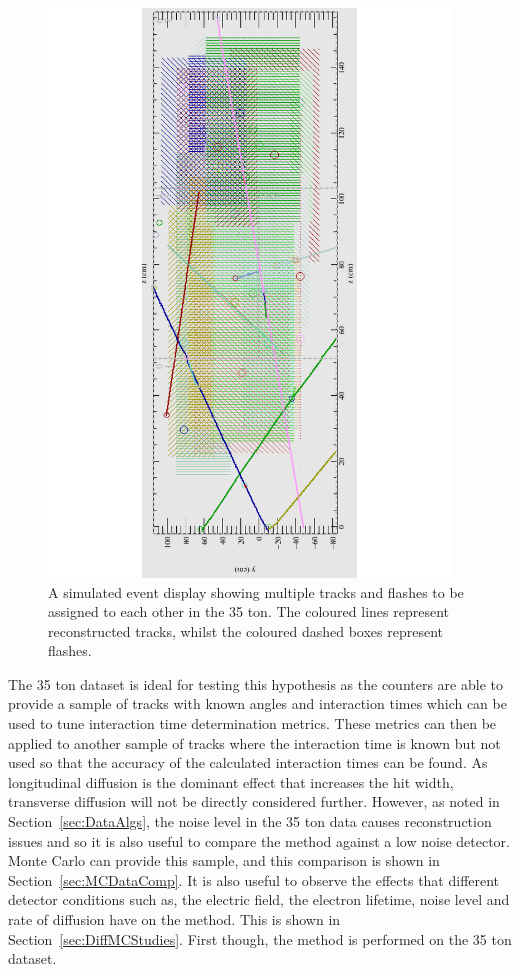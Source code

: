\begin{figure}[h!]
  \centering
  \includegraphics[width=0.95\textwidth]{LotsOfTrackFlash}
  \caption[A simulated event display showing multiple tracks and flashes in the 35 ton]
          {A simulated event display showing multiple tracks and flashes to be assigned to each other in the 35 ton. The coloured lines represent reconstructed tracks, whilst the coloured dashed boxes represent flashes.}
          \label{fig:DiffLotsOfFlashes}
\end{figure}

The 35 ton dataset is ideal for testing this hypothesis as the counters are able to provide a sample of tracks with known angles and interaction times which can be used to tune interaction time determination metrics. These metrics can then be applied to another sample of tracks where the interaction time is known but not used so that the accuracy of the calculated interaction times can be found. As longitudinal diffusion is the dominant effect that increases the hit width, transverse diffusion will not be directly considered further. However, as noted in Section~\ref{sec:DataAlgs}, the noise level in the 35 ton data causes reconstruction issues and so it is also useful to compare the method against a low noise detector. Monte Carlo can provide this sample, and this comparison is shown in Section~\ref{sec:MCDataComp}. It is also useful to observe the effects that different detector conditions such as, the electric field, the electron lifetime, noise level and rate of diffusion have on the method. This is shown in Section~\ref{sec:DiffMCStudies}. First though, the method is performed on the 35 ton dataset.

